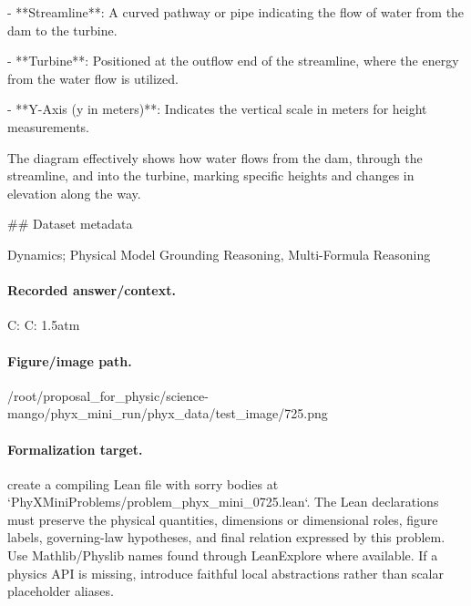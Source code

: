 - **Streamline**: A curved pathway or pipe indicating the flow of water from the dam to the turbine.

- **Turbine**: Positioned at the outflow end of the streamline, where the energy from the water flow is utilized.

- **Y-Axis (y in meters)**: Indicates the vertical scale in meters for height measurements.

The diagram effectively shows how water flows from the dam, through the streamline, and into the turbine, marking specific heights and changes in elevation along the way.

\#\# Dataset metadata

Dynamics; Physical Model Grounding Reasoning, Multi-Formula Reasoning

\paragraph{Recorded answer/context.}
C: C: 1.5atm

\paragraph{Figure/image path.}
/root/proposal\_for\_physic/science-mango/phyx\_mini\_run/phyx\_data/test\_image/725.png

\paragraph{Formalization target.}
create a compiling Lean file with sorry bodies at `PhyXMiniProblems/problem\_phyx\_mini\_0725.lean`. The Lean declarations must preserve the physical quantities, dimensions or dimensional roles, figure labels, governing-law hypotheses, and final relation expressed by this problem.
Use Mathlib/Physlib names found through LeanExplore where available. If a physics API is missing, introduce faithful local abstractions rather than scalar placeholder aliases.

